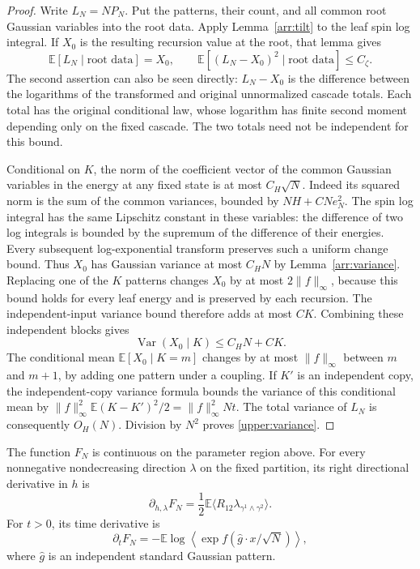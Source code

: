 \begin{proof}
Write $L_N=NP_N$. Put the patterns, their count, and all common
root Gaussian variables into the root data. Apply
Lemma~\ref{arr:tilt} to the leaf spin log integral. If $X_0$
is the resulting recursion value at the root, that lemma gives
\[
 \mathbb E[L_N\mid\text{root data}]=X_0,
 \qquad
 \mathbb E[(L_N-X_0)^2\mid\text{root data}]\le C_{\zeta}.
\]
The second assertion can also be seen directly: $L_N-X_0$
is the difference between the logarithms of the transformed
and original unnormalized cascade totals. Each total has the
original conditional law, whose logarithm has finite second
moment depending only on the fixed cascade. The two totals
need not be independent for this bound.

Conditional on $K$, the norm of the coefficient vector of the
common Gaussian variables in the energy at any fixed state is
at most $C_H\sqrt N$. Indeed its squared norm is the sum of
the common variances, bounded by $NH+CNe_N^2$.
The spin log integral has the same Lipschitz constant in these
variables: the difference of two log integrals is bounded by
the supremum of the difference of their energies. Every
subsequent log-exponential transform preserves such a uniform
change bound. Thus $X_0$ has Gaussian variance at most $C_HN$
by Lemma~\ref{arr:variance}. Replacing one of the $K$ patterns
changes $X_0$ by at most $2\|f\|_\infty$, because this bound
holds for every leaf energy and is preserved by each recursion.
The independent-input variance bound therefore adds at most
$C K$. Combining these independent blocks gives
\[
 \operatorname{Var}(X_0\mid K)\le C_HN+C K.
\]
The conditional mean $\mathbb E[X_0\mid K=m]$ changes by at
most $\|f\|_\infty$ between $m$ and $m+1$, by adding one
pattern under a coupling. If $K'$ is an independent copy,
the independent-copy variance formula bounds the variance of
this conditional mean by
$\|f\|_\infty^2\mathbb E(K-K')^2/2
=\|f\|_\infty^2Nt$.
The total variance of $L_N$ is consequently $O_H(N)$.
Division by $N^2$ proves \eqref{upper:variance}.
\end{proof}

\begin{lemma}
\label{upper:derivatives}
The function $F_N$ is continuous on the parameter region above.
For every nonnegative nondecreasing direction $\lambda$ on
the fixed partition, its right directional derivative in $h$ is
\begin{equation}
\label{upper:field-derivative}
 \partial_{h,\lambda}F_N
 =\frac12\mathbb E\langle
       R_{12}\lambda_{\gamma^1\wedge\gamma^2}\rangle.
\end{equation}
For $t>0$, its time derivative is
\begin{equation}
\label{upper:time-derivative}
 \partial_tF_N
 =-\mathbb E\log\left\langle
    \exp f(\widehat g\cdot x/\sqrt N)\right\rangle,
\end{equation}
where $\widehat g$ is an independent standard Gaussian pattern.
\end{lemma}

